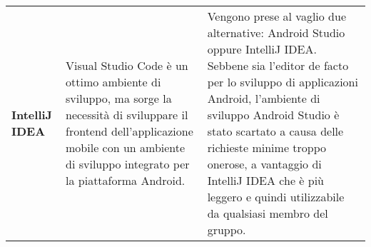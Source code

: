 \documentclass[../piano-di-qualifica.tex]{subfiles}
\begin{document}
\begin{longtable}[H]{>{\centering\bfseries}m{4cm} >{\centering\arraybackslash}m{6cm} >{\centering\arraybackslash}m{6cm}}
    IntelliJ IDEA & Visual Studio Code è un ottimo ambiente di sviluppo, ma sorge la necessità di sviluppare il frontend dell'applicazione mobile con un ambiente di sviluppo integrato per la piattaforma Android. & Vengono prese al vaglio due alternative: Android Studio oppure IntelliJ IDEA\@. Sebbene sia l'editor de facto per lo sviluppo di applicazioni Android, l'ambiente di sviluppo Android Studio è stato scartato a causa delle richieste minime troppo onerose, a vantaggio di IntelliJ IDEA che è più leggero e quindi utilizzabile da qualsiasi membro del gruppo. \\
  \end{longtable}
\end{document}
